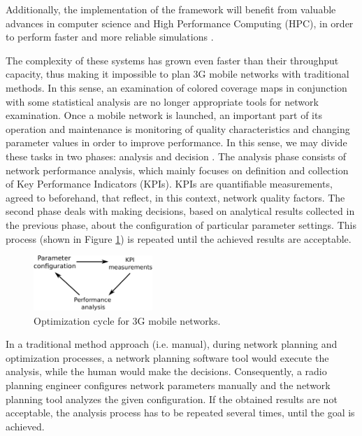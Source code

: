 Additionally, the implementation of the framework will benefit from
valuable advances in computer science and High Performance Computing
(HPC), in order to perform faster and more reliable simulations \cite{gorder2007multicore,wen2011gpu}.

The complexity of these systems has grown even faster than their throughput
capacity, thus making it impossible to plan 3G mobile networks with
traditional methods. In this sense, an examination of colored coverage
maps in conjunction with some statistical analysis are no longer appropriate
tools for network examination. Once a mobile network is launched,
an important part of its operation and maintenance is monitoring of
quality characteristics and changing parameter values in order to
improve performance. In this sense, we may divide these tasks in two
phases: analysis and decision \cite{nawrocki2006understanding}. The
analysis phase consists of network performance analysis, which mainly
focuses on definition and collection of Key Performance Indicators
(KPIs). KPIs are quantifiable measurements, agreed to beforehand,
that reflect, in this context, network quality factors. The second
phase deals with making decisions, based on analytical results collected
in the previous phase, about the configuration of particular parameter
settings. This process (shown in Figure \ref{fig:Optimization-cycle})
is repeated until the achieved results are acceptable.

\begin{figure}
\centering

\includegraphics[width=0.4\textwidth]{02-background_and_motivation/img/optimization_cycle}

\caption{Optimization cycle for 3G mobile networks.\label{fig:Optimization-cycle}}
\end{figure}


In a traditional method approach (i.e. manual), during network planning
and optimization processes, a network planning software tool would
execute the analysis, while the human would make the decisions. Consequently,
a radio planning engineer configures network parameters manually and
the network planning tool analyzes the given configuration. If the
obtained results are not acceptable, the analysis process has to be
repeated several times, until the goal is achieved.

